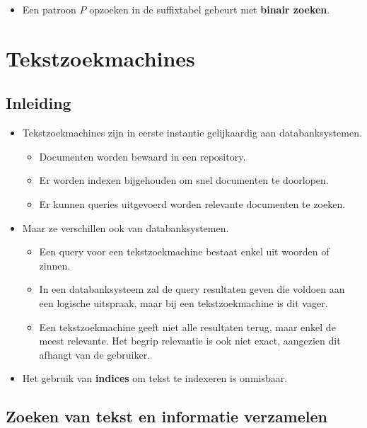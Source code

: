 \begin{itemize}
    \item Een patroon $P$ opzoeken in de suffixtabel gebeurt met \textbf{binair zoeken}.
\end{itemize}

\section{Tekstzoekmachines}
\subsection{Inleiding}
\begin{itemize}
    \item Tekstzoekmachines zijn in eerste instantie gelijkaardig aan databanksystemen.
    \begin{itemize}
        \item Documenten worden bewaard in een repository.
        \item Er worden indexen bijgehouden om snel documenten te doorlopen.
        \item Er kunnen queries uitgevoerd worden relevante documenten te zoeken.
    \end{itemize}
    \item Maar ze verschillen ook van databanksystemen.
    \begin{itemize}
        \item Een query voor een tekstzoekmachine bestaat enkel uit woorden of zinnen.
        \item In een databanksysteem zal de query resultaten geven die voldoen aan een logische uitspraak, maar bij een tekstzoekmachine is dit vager.
        \item Een tekstzoekmachine geeft niet alle resultaten terug, maar enkel de meest relevante. Het begrip relevantie is ook niet exact, aangezien dit afhangt van de gebruiker.
    \end{itemize}
    \item Het gebruik van \textbf{indices} om tekst te indexeren is onmisbaar.
\end{itemize}

\subsection{Zoeken van tekst en informatie verzamelen}
